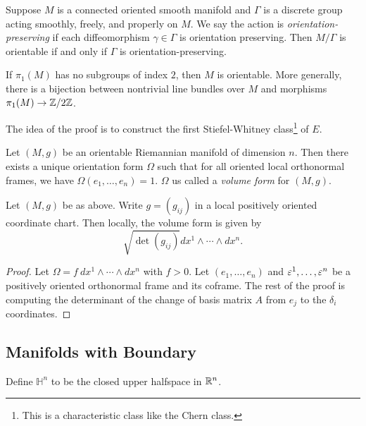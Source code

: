 \documentclass[twoside, 10pt]{article}
\begin{document}
    \begin{prop}
        Suppose $M$ is a connected oriented smooth manifold and $\Gamma$ is a discrete group acting smoothly, freely, and properly on $M$. We say the action is \textit{orientation-preserving} if each diffeomorphism $\gamma \in \Gamma$ is orientation preserving. Then $M/\Gamma$ is orientable if and only if $\Gamma$ is orientation-preserving.
    \end{prop}

    \begin{cor}
        If $\pi_1(M)$ has no subgroups of index $2$, then $M$ is orientable. More generally, there is a bijection between nontrivial line bundles over $M$ and morphisms $\pi_1(M) \to \mathbb{Z}/2\mathbb{Z}$.
    \end{cor}

    The idea of the proof is to construct the first Stiefel-Whitney class\footnote{This is a characteristic class like the Chern class.} of $E$. 

    \begin{prop}
        Let $(M,g)$ be an orientable Riemannian manifold of dimension $n$. Then there exists a unique orientation form $\Omega$ such that for all oriented local orthonormal frames, we have $\Omega(e_1, \ldots, e_n) = 1$. $\Omega$ us called a \textit{volume form} for $(M,g)$.
    \end{prop}

    \begin{lem}
        Let $(M,g)$ be as above. Write $g = (g_{ij})$ in a local positively oriented coordinate chart. Then locally, the volume form is given by
        \[ \sqrt{\det(g_{ij})} dx^1 \wedge \cdots \wedge dx^n.\]
    \end{lem}

    \begin{proof}
        Let $\Omega = f\ dx^1 \wedge \cdots \wedge dx^n$ with $f > 0$. Let $(e_1, \ldots, e_n)$ and $\varepsilon^1, \ldots, \varepsilon^n$ be a positively oriented orthonormal frame and its coframe. The rest of the proof is computing the determinant of the change of basis matrix $A$ from $e_j$ to the $\delta_i$ coordinates.
    \end{proof}

    \subsection{Manifolds with Boundary}%
    \label{sub:manifolds_with_boundary}
    
    Define $\mathbb{H}^n$ to be the closed upper halfspace in $\mathbb{R}^n$.
\end{document}
